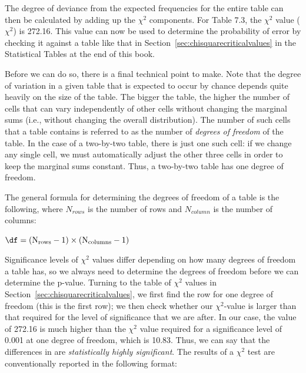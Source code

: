 The degree of deviance from the expected  frequencies for the entire table can then be calculated by adding up the $\chi^2$  components. For Table 7.3, the $\chi^2$ value ($\chi^2$) is 272.16. This value can now be used to determine the probability  of error by checking it against a table like that in Section~\ref{sec:chisquarecriticalvalues} in the Statistical Tables at the end of this book.

Before we can do so, there is a final technical point to make. Note that the degree of variation  in a given table that is expected  to occur by chance  depends quite heavily on the size of the table. The bigger the table, the higher the number of cells that can vary independently of other cells without changing the marginal sums (i.e., without changing the overall distribution).  The number of such cells that a table contains is referred to as the number of \textit{degrees of freedom} of the table. In the case of a two\hyp{}by\hyp{}two table, there is just one such cell: if we change any single cell, we must automatically adjust the other three cells in order to keep the marginal sums constant. Thus, a two\hyp{}by\hyp{}two table has one degree of freedom.

The general formula for determining the degrees of freedom of a table is the following, where $N_{rows}$ is the number of rows and $N_{column}$ is the number of columns:

\begin{exe}
\ex $\displaystyle{\df = (\text{N}_\text{rows} - 1) \times (\text{N}_\text{columns} - 1)}$
\label{ex:formuladf}
\end{exe}

Significance levels of $\chi^2$  values differ depending on how many degrees of freedom a table has, so we always need to determine the degrees of freedom before we can determine the p\hyp{}value. Turning to the table of $\chi^2$ values in Section~\ref{sec:chisquarecriticalvalues},  we first find the row for one degree of freedom (this is the first row); we then check whether our $\chi^2$-value is larger than that required for the level of significance  that we are after. In our case, the value of 272.16 is much higher than the $\chi^2$ value required for a significance level of 0.001 at one degree of freedom, which is 10.83. Thus, we can say that the differences in  are \textit{statistically highly significant}. The results of a $\chi^2$  test are conventionally reported in the following format:

